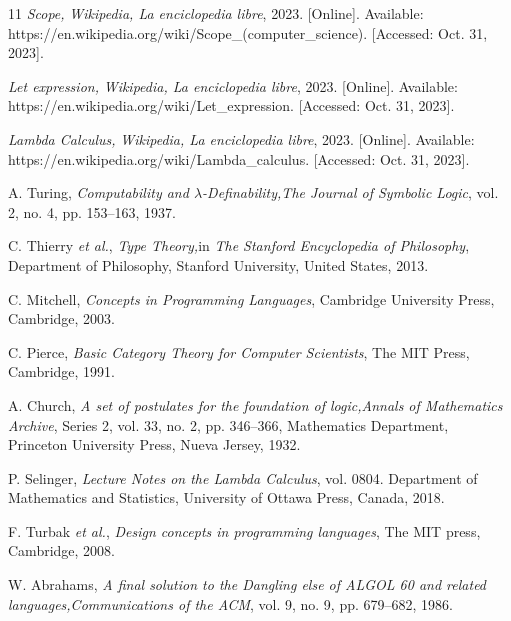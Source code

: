 \begin{thebibliography}{11}
    \label{sec:80}
    \hypertarget{80}{}
    \textit{Scope, }\textit{Wikipedia, La enciclopedia libre}, 2023. [Online]. Available: https://en.wikipedia.org/wiki/Scope\_(computer\_science). [Accessed: Oct. 31, 2023].
    
    \label{sec:81}
    \hypertarget{81}{}
    \textit{Let expression, }\textit{Wikipedia, La enciclopedia libre}, 2023. [Online]. Available: https://en.wikipedia.org/wiki/Let\_expression. [Accessed: Oct. 31, 2023].

    \label{sec:82}
    \hypertarget{82}{}
    \textit{Lambda Calculus, }\textit{Wikipedia, La enciclopedia libre}, 2023. [Online]. Available: https://en.wikipedia.org/wiki/Lambda\_calculus. [Accessed: Oct. 31, 2023].

    \label{sec:83}
    \hypertarget{83}{}
    A. Turing, \textit{Computability and $\lambda$-Definability,}\textit{The Journal of Symbolic Logic}, vol. 2, no. 4, pp. 153–163, 1937.

    \label{sec:84}
    \hypertarget{84}{}
    C. Thierry \textit{et al.}, \textit{Type Theory,}in \textit{The Stanford Encyclopedia of Philosophy}, Department of Philosophy, Stanford University, United States, 2013.
    
    \label{sec:85}
    \hypertarget{85}{}
    C. Mitchell, \textit{Concepts in Programming Languages}, Cambridge University Press, Cambridge, 2003.

    \label{sec:86}
    \hypertarget{86}{}
    C. Pierce, \textit{Basic Category Theory for Computer Scientists}, The MIT Press, Cambridge, 1991.

    \label{sec:87}
    \hypertarget{87}{}
    A. Church, \textit{A set of postulates for the foundation of logic,}\textit{Annals of Mathematics Archive}, Series 2, vol. 33, no. 2, pp. 346–366, Mathematics Department, Princeton University Press, Nueva Jersey, 1932.

    \label{sec:88}
    \hypertarget{88}{}
    P. Selinger, \textit{Lecture Notes on the Lambda Calculus}, vol. 0804. Department of Mathematics and Statistics, University of Ottawa Press, Canada, 2018.

    \label{sec:89}
    \hypertarget{89}{}
    F. Turbak \textit{et al.}, \textit{Design concepts in programming languages}, The MIT press, Cambridge, 2008.

    \label{sec:90}
    \hypertarget{90}{}
    W. Abrahams, \textit{A final solution to the Dangling else of ALGOL 60 and related languages,}\textit{Communications of the ACM}, vol. 9, no. 9, pp. 679–682, 1986.


\end{thebibliography}
